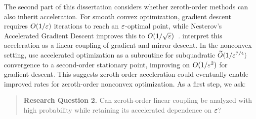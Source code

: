 The second part of this dissertation considers whether zeroth-order methods can also inherit acceleration. For smooth convex optimization, gradient descent requires $O(1/\varepsilon)$ iterations to reach an $\varepsilon$-optimal point, while Nesterov's Accelerated Gradient Descent improves this to $O(1/\sqrt{\varepsilon})$~\citep{nesterov1983method}. \citet{allenZhu2016linear} interpret this acceleration as a linear coupling of gradient and mirror descent. In the nonconvex setting, \citet{carmon2018accelerated} use accelerated optimization as a subroutine for subquadratic $\widetilde{O}(1/\varepsilon^{7/4})$ convergence to a second-order stationary point, improving on $O(1/\varepsilon^2)$ for gradient descent. This suggests zeroth-order acceleration could eventually enable improved rates for zeroth-order nonconvex optimization. As a first step, we ask:
\begin{quote}
\textbf{Research Question 2.}
Can zeroth-order linear coupling be analyzed with high probability while retaining its accelerated dependence on $\varepsilon$?
\end{quote}


